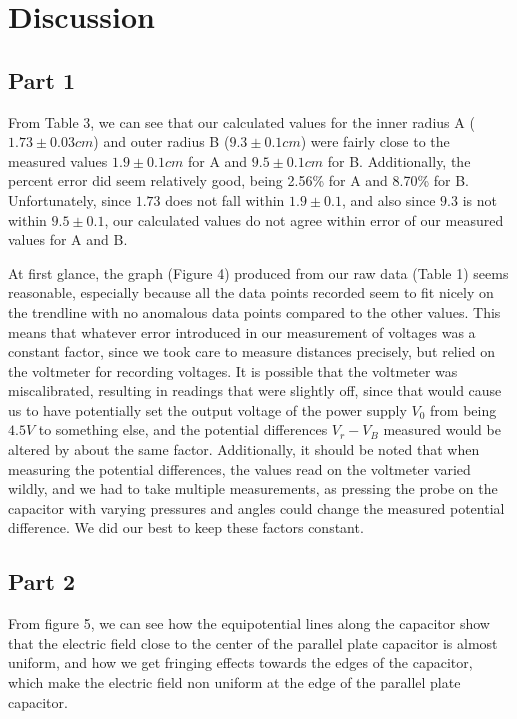 \documentclass[letterpaper]{article}
\begin{document}
\section{Discussion}

\subsection{Part 1}
From Table 3, we can see that our calculated values for the inner radius A
($1.73 \pm 0.03 cm$)
and outer radius B
($9.3 \pm 0.1 cm$) were fairly close to the measured values $1.9 \pm 0.1 cm$ for A
and $ 9.5 \pm 0.1 cm$ for B.
Additionally, the percent error did seem relatively good, being 2.56\% for A and 8.70\% for B.
Unfortunately, since $1.73$ does not fall within $1.9 \pm 0.1$,
and also since $9.3$ is not within $9.5 \pm 0.1$, our calculated values do not
agree within error of our measured values for A and B.

At first glance, the graph (Figure 4) produced from our raw data (Table 1) seems reasonable, especially
because all the data points recorded seem to fit nicely on the trendline with
no anomalous data points compared to the other values. This means that whatever error
introduced in our measurement of voltages was a constant factor, since we took care
to measure distances precisely, but relied on the voltmeter for recording voltages.
It is possible that the voltmeter was miscalibrated, resulting in readings that were slightly off,
since that would cause us to have potentially set the output voltage of the power supply $V_0$ from being $4.5 V$ to something else,
and the potential differences $V_r-V_B$ measured would be altered by about the same factor. Additionally,
it should be noted that when measuring the potential differences, the values read on the voltmeter varied
wildly, and we had to take multiple measurements, as pressing the probe on the capacitor with varying pressures and
angles could change the measured potential difference. We did our best to keep these factors constant.

\subsection{Part 2}
From figure 5, we can see how the equipotential lines along the capacitor show that the
electric field close to the center of the parallel plate capacitor is almost uniform, and
how we get fringing effects towards the edges of the capacitor, which make the electric field non uniform
at the edge of the parallel plate capacitor.
\end{document}
